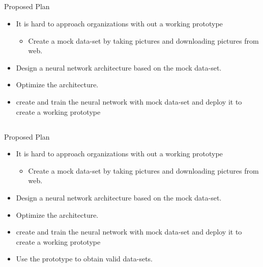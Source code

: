 \documentclass{beamer}
\begin{document}
\subsection*{}
\begin{frame}{Proposed Plan}
\begin{itemize}
\item{
It is hard to approach organizations with out a working prototype
\begin{itemize}
\item{
Create a mock data-set by taking pictures and downloading pictures from web.
}
\end{itemize}
}
\item{
Design a neural network architecture based on the mock data-set.
}
\item{
Optimize the architecture.
}
\item{
create and train the neural network with mock data-set and deploy it to create a working prototype
}
\end{itemize}
\end{frame}
\subsection*{}
\begin{frame}{Proposed Plan}
\begin{itemize}
\item{
It is hard to approach organizations with out a working prototype
\begin{itemize}
\item{
Create a mock data-set by taking pictures and downloading pictures from web.
}
\end{itemize}
}
\item{
Design a neural network architecture based on the mock data-set.
}
\item{
Optimize the architecture.
}
\item{
create and train the neural network with mock data-set and deploy it to create a working prototype
}
\item{
Use the prototype to obtain valid data-sets.
}
\end{itemize}
\end{frame}
\end{document}
